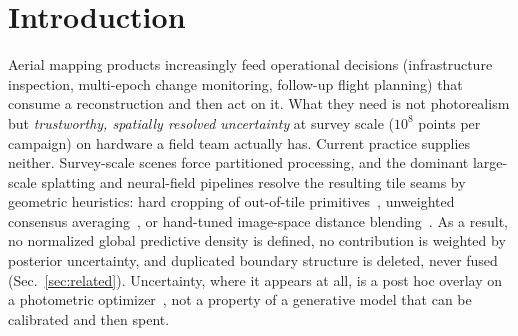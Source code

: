 \section{Introduction}
\label{sec:intro}

 Aerial mapping products increasingly feed operational
decisions (infrastructure inspection, multi-epoch change monitoring,
follow-up flight planning) that consume a reconstruction and then act
on it. What they need is not photorealism but \emph{trustworthy, spatially
resolved uncertainty} at survey scale ($10^{8}$ points per campaign)
on hardware a field team actually has.  Current practice supplies neither.
Survey-scale scenes force partitioned processing, and the dominant large-scale
splatting and neural-field pipelines resolve the resulting tile seams by
geometric heuristics: hard cropping of out-of-tile primitives~\cite{lin2024vastgaussian,liu2024citygaussian,kerbl2024hierarchical},
unweighted consensus averaging~\cite{chen2024dogs}, or hand-tuned
image-space distance blending~\cite{tancik2022blocknerf}. As a result, no
normalized global
predictive density is defined, no contribution is weighted by posterior
uncertainty, and duplicated boundary structure is deleted, never fused
(Sec.~\ref{sec:related}). Uncertainty, where it appears at all, is a post hoc
overlay on a photometric optimizer~\cite{jia2026bayesian}, not a
property of a generative model that can be calibrated and then spent.

